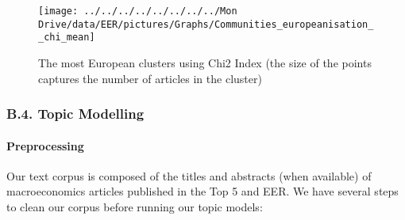 \documentclass[
  12pt,
  onecolumn]{article}
\begin{document}
\begin{figure}[H]

{\centering \texttt{[image: ../../../../../../../../Mon Drive/data/EER/pictures/Graphs/Communities\_europeanisation\_\_chi\_mean]} 

}

\caption{The most European clusters using Chi2 Index (the size of the points captures the number of articles in the cluster)}\label{fig:plot-chi-two-mean}
\end{figure}

\hypertarget{topic}{%
\subsubsection*{B.4. Topic Modelling}\label{topic}}

\hypertarget{preprocessing}{%
\paragraph*{Preprocessing}\label{preprocessing}}

Our text corpus is composed of the titles and abstracts (when available) of macroeconomics articles published in the Top 5 and EER. We have several steps to clean our corpus before running our topic models:
\end{document}
